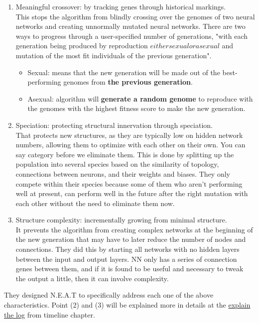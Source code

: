 \begin{enumerate} \label{list:3tweanns}
	\item Meaningful crossover: by tracking genes through historical markings.\\
	This stops the algorithm from blindly crossing over the genomes of two neural networks and creating unnormally mutated neural networks. There are two ways to progress through a user-specified number of generations, "with each generation being produced by reproduction \(either sexual or asexual\) and mutation of the most fit individuals of the previous generation".
	\begin{itemize}
		\item Sexual: means that the new generation will be made out of the best-performing genomes from \textbf{the previous generation}.
		\item Asexual: algorithm will \textbf{generate a random genome} to reproduce with the genomes with the highest fitness score to make the new generation.
	\end{itemize}
	
	\item Speciation: protecting structural innervation through speciation.\\
	That protects new structures, as they are typically low on hidden network numbers, allowing them to optimize with each other on their own. You can say category before we eliminate them. This is done by splitting up the population into several species based on the similarity of topology, connections between neurons, and their weights and biases. They only compete within their species because some of them who aren’t performing well at present, can perform well in the future after the right mutation with each other without the need to eliminate them now.
	\item Structure complexity: incrementally growing from minimal structure.\\
It prevents the algorithm from creating complex networks at the beginning of the new generation that may have to later reduce the number of nodes and connections. They did this by starting all networks with no hidden layers between the input and output layers. NN only has a series of connection genes between them, and if it is found to be useful and necessary to tweak the output a little, then it can involve complexity.
\end{enumerate}

They designed N.E.A.T to specifically address each one of the above characteristics. Point (2) and (3) will be explained more in details at the \hyperref[sec:explain-the-log]{explain the log} from timeline chapter.



